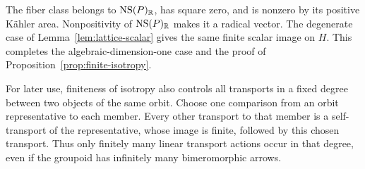 The fiber class belongs to \(\operatorname{NS}(P)_\mathbb R\), has square zero, and is nonzero
by its positive K\"ahler area.  Nonpositivity of \(\operatorname{NS}(P)_\mathbb R\) makes it
a radical vector.  The degenerate case of
Lemma~\ref{lem:lattice-scalar} gives the same finite scalar image on \(H\).
This completes the algebraic-dimension-one case and the proof of
Proposition~\ref{prop:finite-isotropy}.

For later use, finiteness of isotropy also controls all transports in a
fixed degree between two objects of the same orbit.  Choose one comparison
from an orbit representative to each member.  Every other transport to
that member is a self-transport of the representative, whose image is
finite, followed by this chosen transport.  Thus only finitely many linear
transport actions occur in that degree, even if the groupoid has infinitely
many bimeromorphic arrows.
